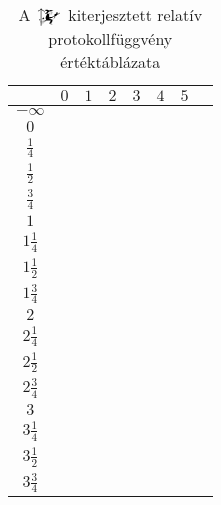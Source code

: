 \documentclass{article}
\newcommand{\blk}{\cellcolor{darkgray}}
\newcommand{\red}{\cellcolor{red!33}}
\newcommand{\grn}{\cellcolor{green!33}}
\newcommand{\ylw}{\cellcolor{yellow}}
\newcommand{\nothing}{\text{\raisebox{0.4em}{\rotatebox{180}{$\curvearrowleft$}}}}%
\newcommand{\just}[1]{\boxed{#1}}%
\newcommand{\incl}{\mathbf{incl}}
\newcommand{\excl}{\mathbf{excl}}
\newcommand{\mainfunext}[3]{\left\uparrow\!\!\!\mathwitch*_{#2}^{#1}#3\right.}
\begin{document}
	\begin{table}[H]
		\caption*{A $\mainfunext{}{}{}$ kiterjesztett relatív protokollfüggvény értéktáblázata}
		\centering
		\begin{tabular}{c||c|c|c|c|c|c|c|}
				&	$0$		&	$1$		&	$2$		&	$3$		&	$4$		&	$5$		\\\hline\hline
		$-\infty$	&	\nothing	&	\nothing	&	\nothing	&	\nothing	&	\nothing	&	\nothing	\\\hline
			$0$	&	\nothing	&	\nothing	&	\nothing	&	\nothing	&	\nothing	&	\grn\just\incl	\\\hline
		$\frac14$	&	\ylw\nothing	&	\ylw\nothing	&	\ylw\nothing	&	\ylw\nothing	&	\ylw\nothing	&	\ylw\nothing	\\\hline
		$\frac12$	&	\red\just\excl	&	\nothing	&	\nothing	&	\nothing	&	\nothing	&	\grn\just\incl	\\\hline
		$\frac34$	&	\ylw\nothing	&	\ylw\nothing	&	\ylw\nothing	&	\ylw\nothing	&	\ylw\nothing	&	\ylw\nothing	\\\hline
			$1$	&	\red\just\excl	&	\nothing	&	\nothing	&	\nothing	&	\grn\just\incl	&	\blk		\\\hline
		$1\frac14$	&	\ylw\nothing	&	\ylw\nothing	&	\ylw\nothing	&	\ylw\nothing	&	\ylw\nothing	&	\ylw		\\\hline
		$1\frac12$	&	\blk		&	\red\just\excl	&	\nothing	&	\nothing	&	\grn\just\incl	&	\blk		\\\hline
		$1\frac34$	&	\ylw		&	\ylw\nothing	&	\ylw\nothing	&	\ylw\nothing	&	\ylw\nothing	&	\ylw		\\\hline
			$2$	&	\blk		&	\red\just\excl	&	\nothing	&	\grn\just\incl	&	\blk		&	\blk		\\\hline
		$2\frac14$	&	\ylw		&	\ylw\nothing	&	\ylw\nothing	&	\ylw\nothing	&	\ylw		&	\ylw		\\\hline
		$2\frac12$	&	\blk		&	\blk		&	\red\just\excl	&	\grn\just\incl	&	\blk		&	\blk		\\\hline
		$2\frac34$	&	\ylw		&	\ylw		&	\ylw\nothing	&	\ylw\nothing	&	\ylw		&	\ylw		\\\hline
			$3$	&	\blk		&	\blk		&	\blk		&	\blk		&	\blk		&	\blk		\\\hline
		$3\frac14$	&	\ylw		&	\ylw		&	\ylw		&	\ylw		&	\ylw		&	\ylw		\\\hline
		$3\frac12$	&	\blk		&	\blk		&	\blk		&	\blk		&	\blk		&	\blk		\\\hline
		$3\frac34$	&	\ylw		&	\ylw		&	\ylw		&	\ylw		&	\ylw		&	\ylw		\\\hline
		\end{tabular}
	\end{table}
\end{document}
